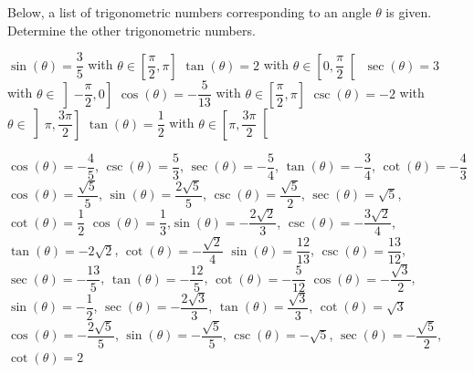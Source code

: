 \begin{Exercise} Below, a list of trigonometric numbers corresponding to an angle $\theta$ is given. Determine the other trigonometric numbers. %
	\begin{multicols}{2}
	\Question[difficulty = 1] $\sin (\theta) = \dfrac{3}{5}$\quad\;\hspace{0.05cm} with\;\; $\theta\in \left[\dfrac{\pi}{2},\pi\right]$
	\Question[difficulty = 1] $\tan (\theta) = 2$\quad\;\hspace{0.04cm} with\;\; $\theta\in \left[0,\dfrac{\pi}{2}\right[$
	\Question[difficulty = 1] $\sec (\theta)= 3$\quad\; with\;\; $\theta\in \left]-\dfrac{\pi}{2},0\right]$
	\Question[difficulty = 1] $\cos (\theta) = -\dfrac{5}{13}$\quad\; with\;\; $\theta\in \left[\dfrac{\pi}{2},\pi\right]$
	\Question[difficulty = 1] $\csc (\theta) = -2$\quad\;\hspace{0.246cm}  with\;\; $\theta\in \left]\pi,\dfrac{3\pi}{2}\right]$
	\Question[difficulty = 1] $\tan (\theta) = \dfrac{1}{2}$\quad\;\hspace{0.486cm}  with\;\; $\theta\in \left[\pi,\dfrac{3\pi}{2}\right[$
	\EndCurrentQuestion
	\end{multicols}

\end{Exercise}

\begin{Answer}\phantom{}
    
	\Question $\cos (\theta) = -\dfrac{4}{5}$, \quad $\csc(\theta) = \dfrac{5}{3}$, \quad $\sec(\theta) = -\dfrac{5}{4}$, \quad $\tan (\theta) =- \dfrac{3}{4}$, \quad $\cot (\theta) = -\dfrac{4}{3}$
	\Question $\cos (\theta) = \dfrac{\sqrt{5}}{5}$, \quad $\sin (\theta) =  \dfrac{2\sqrt{5}}{5}$, \quad $\csc(\theta) = \dfrac{\sqrt{5}}{2}$, \quad $\sec(\theta) = \sqrt{5}$, \quad $\cot (\theta) = \dfrac{1}{2}$
	\Question $\cos (\theta) = \dfrac{1}{3}$,\quad $\sin (\theta) = -\dfrac{2\sqrt{2}}{3}$, \quad $\csc(\theta) = -\dfrac{3 \sqrt{2}}{4}$, \quad $\tan (\theta) = -2\sqrt{2}$, \quad $\cot(\theta) = -\dfrac{\sqrt{2}}{4}$
	\Question  $\sin (\theta) = \dfrac{12}{13}$, \quad $\csc(\theta) = \dfrac{13}{12}$, \quad $\sec(\theta) = -\dfrac{13}{5}$, \quad $\tan (\theta) = -\dfrac{12}{5}$, \quad $\cot (\theta) = -\dfrac{5}{12}$
	\Question $\cos (\theta) = -\dfrac{\sqrt{3}}{2}$, \quad $\sin (\theta) = -\dfrac{1}{2}$, \quad $\sec(\theta) = -\dfrac{2\sqrt{3}}{3}$, \quad $\tan (\theta) = \dfrac{\sqrt{3}}{3}$, \quad $\cot (\theta) = \sqrt{3}$
	\Question $\cos (\theta) = -\dfrac{2\sqrt{5}}{5}$, \quad $\sin (\theta) =-  \dfrac{\sqrt{5}}{5}$, \quad $\csc(\theta) = -\sqrt{5}$, \quad $\sec(\theta) = - \dfrac{\sqrt{5}}{2}$, \quad $\cot (\theta) = 2$
\end{Answer}
	


